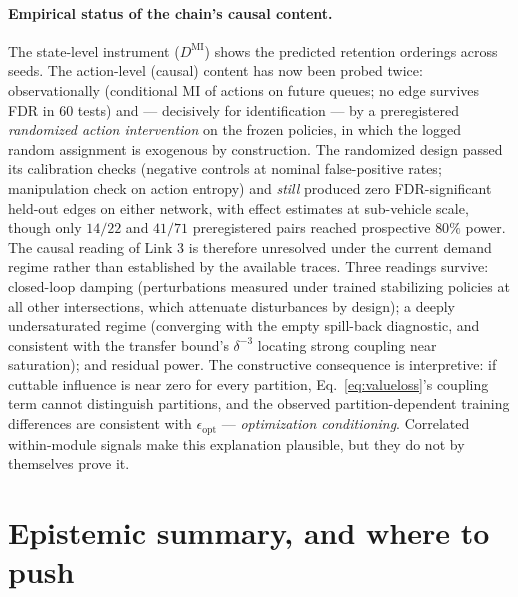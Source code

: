 \documentclass[11pt]{article}
\theoremstyle{definition}
\theoremstyle{remark}
\begin{document}
\paragraph{Empirical status of the chain's causal content.}
The state-level instrument ($D^{\mathrm{MI}}$) shows the predicted retention
orderings across seeds.
The action-level (causal) content has now been probed twice: observationally
(conditional MI of actions on future queues; no edge survives FDR in 60
tests) and --- decisively for identification --- by a preregistered
\emph{randomized action intervention} on the frozen policies, in which the
logged random assignment is exogenous by construction.
The randomized design passed its calibration checks (negative controls at
nominal false-positive rates; manipulation check on action entropy) and
\emph{still} produced zero FDR-significant held-out edges on either network,
with effect estimates at sub-vehicle scale, though only $14/22$ and $41/71$
preregistered pairs reached prospective $80\%$ power.
The causal reading of Link 3 is therefore unresolved under the current demand
regime rather than established by the available traces.
Three readings survive: closed-loop damping (perturbations measured under
trained stabilizing policies at all other intersections, which attenuate
disturbances by design); a deeply undersaturated regime (converging with the
empty spill-back diagnostic, and consistent with the transfer bound's
$\delta^{-3}$ locating strong coupling near saturation); and residual power.
The constructive consequence is interpretive: if cuttable influence is near
zero for every partition, Eq.~\eqref{eq:valueloss}'s coupling term cannot
distinguish partitions, and the observed partition-dependent training
differences are consistent with $\epsilon_{\mathrm{opt}}$ ---
\emph{optimization conditioning}.
Correlated within-module signals make this explanation plausible, but they do
not by themselves prove it.

\section{Epistemic summary, and where to push}
\label{sec:strength}
\end{document}
